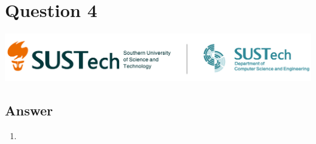 \documentclass[
	12pt, %
]{fphw}
\begin{document}
\section*{Question 4}
\begin{problem}
    \includegraphics[width=440pt]{img/logo.png}
\end{problem}
\subsection*{Answer}
\begin{enumerate}
    \item  %
\end{enumerate}
\end{document}
